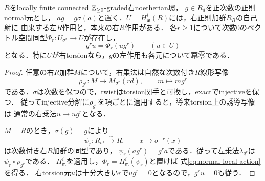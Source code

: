 \documentclass[11pt,a4paper]{ltjsarticle}
\begin{document}
\begin{lemma}[normal元に沿う左局所冪零性]\label{lem:normal-local}
$R$をlocally finite connected $\mathbb Z_{\geq0}$-graded右noetherian環，
$g\in R_d$を正次数の正則normal元とし，
$ag=g\sigma(a)$と置く．$U=H^i_{\mathfrak m}(R)$には，右正則加群$R_R$の自己射に
由来する左$R$作用と，本来の右$R$作用がある．
各$r\geq1$について次数0のベクトル空間同型$\Phi_r:U_{\sigma^r}\to U$が存在し，
\begin{equation}\label{eq:normal-local-action}
 g^r u=\Phi_r(u g^r)\qquad(u\in U)
\end{equation}
となる．特に$U$が右torsionなら，$g$の左作用も各元について冪零である．
\end{lemma}
\begin{proof}
任意の右$R$加群$M$について，右乗法は自然な次数付き$R$線形写像
\[
 \rho_{g^r}:M\longrightarrow M_{\sigma^r}(rd),\qquad m\longmapsto mg^r
\]
である．$\sigma$は次数を保つので，twistはtorsion関手と可換し，exactでinjectiveを保つ．
従ってinjective分解に$\rho_{g^r}$を項ごとに適用すると，導来torsion上の誘導写像は
通常の右乗法$u\mapsto ug^r$となる．

$M=R$のとき，$\sigma(g)=g$により
\[
 \psi_r:R_{\sigma^r}\xrightarrow{\sim}R,
 \qquad x\longmapsto\sigma^{-r}(x)
\]
は次数付き右$R$加群の同型であり，
$\psi_r(ag^r)=g^ra$である．従って左乗法$\lambda_{g^r}$は
$\psi_r\circ\rho_{g^r}$である．
$H^i_{\mathfrak m}$を適用し，$\Phi_r=H^i_{\mathfrak m}(\psi_r)$と置けば
式\eqref{eq:normal-local-action}を得る．
右torsion元$u$は十分大きい$r$で$ug^r=0$となるので，$g^ru=0$も従う．
\end{proof}
\end{document}

